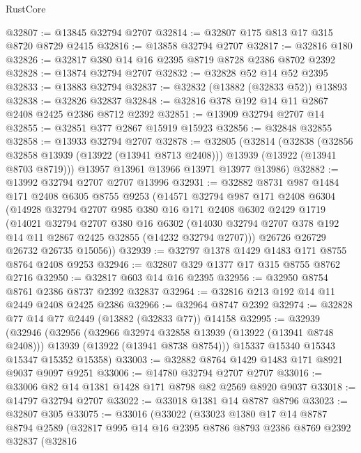\begin{lexlean}{RustCore}
\begin{coremodule}
@32807 := @13845 @32794 @2707
@32814 := @32807 @175 @813 @17 @315 @8720 @8729 @2415
@32816 := @13858 @32794 @2707
@32817 := @32816 @180
@32826 := @32817 @380 @14 @16 @2395 @8719 @8728 @2386 @8702 @2392
@32828 := @13874 @32794 @2707
@32832 := @32828 @52 @14 @52 @2395
@32833 := @13883 @32794
@32837 := @32832 (@13882 (@32833 @52)) @13893
@32838 := @32826 @32837
@32848 := @32816 @378 @192 @14 @11 @2867 @2408 @2425 @2386 @8712 @2392
@32851 := @13909 @32794 @2707 @14
@32855 := @32851 @377 @2867 @15919 @15923
@32856 := @32848 @32855
@32858 := @13933 @32794 @2707
@32878 := @32805
    (@32814
      (@32838
        (@32856 @32858 @13939 (@13922 (@13941 @8713 @2408)))
        @13939
        (@13922 (@13941 @8703 @8719)))
      @13957
      @13961
      @13966
      @13971
      @13977
      @13986)
@32882 := @13992 @32794 @2707 @2707 @13996
@32931 := @32882
    @8731
    @987
    @1484
    @171
    @2408
    @6305
    @8755
    @9253
    (@14571
      @32794
      @987
      @171
      @2408
      @6304
      (@14928
        @32794
        @2707
        @985
        @380
        @16
        @171
        @2408
        @6302
        @2429
        @1719
        (@14021
          @32794
          @2707
          @380
          @16
          @6302
          (@14030 @32794 @2707 @378 @192 @14 @11 @2867 @2425 @32855 (@14232 @32794 @2707)))
        @26726
        @26729
        @26732
        @26735
        @15056))
@32939 := @32797 @1378 @1429 @1483 @171 @8755 @8764 @2408 @9253
@32946 := @32807 @329 @1377 @17 @315 @8755 @8762 @2716
@32950 := @32817 @603 @14 @16 @2395
@32956 := @32950 @8754 @8761 @2386 @8737 @2392 @32837
@32964 := @32816 @213 @192 @14 @11 @2449 @2408 @2425 @2386
@32966 := @32964 @8747 @2392
@32974 := @32828 @77 @14 @77 @2449 (@13882 (@32833 @77)) @14158
@32995 := @32939
    (@32946
      (@32956
        (@32966 @32974 @32858 @13939 (@13922 (@13941 @8748 @2408)))
        @13939
        (@13922 (@13941 @8738 @8754)))
      @15337
      @15340
      @15343
      @15347
      @15352
      @15358)
@33003 := @32882 @8764 @1429 @1483 @171 @8921 @9037 @9097 @9251
@33006 := @14780 @32794 @2707 @2707
@33016 := @33006 @82 @14 @1381 @1428 @171 @8798 @82 @2569 @8920 @9037
@33018 := @14797 @32794 @2707
@33022 := @33018 @1381 @14 @8787 @8796
@33023 := @32807 @305
@33075 := @33016
    (@33022
      (@33023
        @1380
        @17
        @14
        @8787
        @8794
        @2589
        (@32817
          @995
          @14
          @16
          @2395
          @8786
          @8793
          @2386
          @8769
          @2392
          @32837
          (@32816

\end{coremodule}
\end{lexlean}
